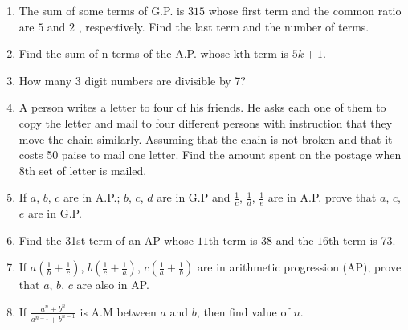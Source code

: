 \begin{enumerate}[label=\thesection.\arabic*,ref=\thesection.\theenumi]
\item The sum of some terms of G.P. is $315$ whose first term and the common ratio are $5$ and $2$ , respectively. Find the last term and the number of terms.\\
\solution

\pagebreak

\item  Find the sum of n terms of the A.P. whose kth term is \(5k + 1\).\\
\solution

\pagebreak

\item How many 3 digit numbers are divisible by 7? \\
\solution


\item A person writes a letter to four of his friends. He asks each one of them to copy the letter and mail to four different persons with instruction that they move the chain similarly. Assuming that the chain is not broken and that it costs 50 paise to mail one letter. Find the amount spent on the postage when 8th set of letter is mailed.\\
\solution

\pagebreak

\item If $a$, $b$, $c$ are in A.P.; $b$, $c$, $d$ are in G.P and $\frac{1}{c}$, $\frac{1}{d}$, $\frac{1}{e}$ are in A.P. prove that $a$, $c$, $e$ are in G.P.\\
\solution

\pagebreak

\item Find the 31st term of an AP whose $11$th term is 38 and the $16$th term is 73.\\ 
\solution


\pagebreak
\item If $a\left(\frac{1}{b} + \frac{1}{c}\right)$, $b\left(\frac{1}{c} + \frac{1}{a}\right)$, $c\left(\frac{1}{a} + \frac{1}{b}\right)$ are in arithmetic progression (AP), prove that $a$, $b$, $c$ are also in AP. \\
\solution

\newpage
\item If \(\frac{a^n +b^n}{a^{n-1} + b^{n-1}}\) is A.M between $a$ and $b$, then find value of $n$.\\
\solution

\pagebreak


\end{enumerate}
